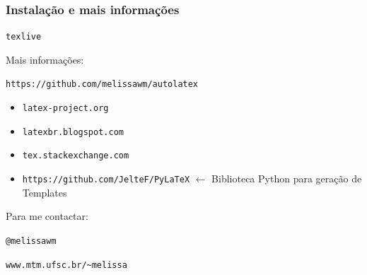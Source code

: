 \documentclass{beamer}
\begin{document}
\begin{frame}[fragile]
   \frametitle{Instalação e mais informações}
   \begin{center}
      \verb+texlive+
   \end{center}
   Mais informações:

   \begin{center}
     \verb+https://github.com/melissawm/autolatex+
   \end{center}

   \begin{itemize}
      \item \verb+latex-project.org+
      \item \verb+latexbr.blogspot.com+
      \item \verb+tex.stackexchange.com+
      \item \verb+https://github.com/JelteF/PyLaTeX+ $\leftarrow$ Biblioteca Python para geração de Templates
   \end{itemize}
   Para me contactar:
   \begin{center}
   \verb+@melissawm+
          
   \verb+www.mtm.ufsc.br/~melissa+
   \end{center}
\end{frame}
\end{document}
